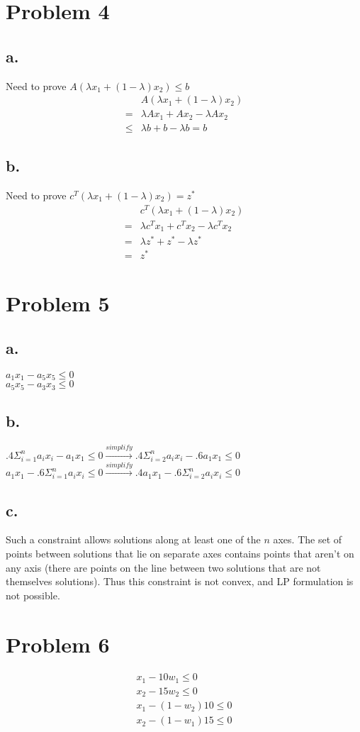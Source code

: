 \documentclass[12pt]{article}
\begin{document}
\newpage
\section*{Problem 4}
\subsection*{a.}
Need to prove $A(\lambda x_1 + (1-\lambda)x_2) \leq b$ \\
\begin{align*}
& A(\lambda x_1 + (1-\lambda)x_2) \\
= & \lambda Ax_1 + Ax_2 - \lambda Ax_2 \\
\leq & \lambda b + b - \lambda b = b
\end{align*}

\subsection*{b.}
Need to prove $c^T(\lambda x_1 + (1 - \lambda)x_2) = z^*$ \\
\begin{align*}
& c^T(\lambda x_1 + (1 - \lambda)x_2) \\
= & \lambda c^T x_1 + c^T x_2 - \lambda c^T x_2 \\
= & \lambda z^* + z^* - \lambda z^* \\
= & z^*
\end{align*}

\newpage
\section*{Problem 5}
\subsection*{a.}
$a_1 x_1 - a_5 x_5 \leq 0$ \\
$a_5 x_5 - a_3 x_3 \leq 0$

\subsection*{b.}
$.4\Sigma_{i=1}^{n} a_i x_i - a_1 x_1 \leq 0 \xrightarrow{simplify} .4\Sigma_{i=2}^{n} a_i x_i - .6 a_1 x_1 \leq 0$ \\
$a_1 x_1 - .6\Sigma_{i=1}^{n} a_i x_i \leq 0 \xrightarrow{simplify} .4 a_1 x_1 - .6\Sigma_{i=2}^{n} a_i x_i \leq 0$

\subsection*{c.}
Such a constraint allows solutions along at least one of the $n$ axes. The set of points between solutions that lie on separate axes contains points that aren't on any axis (there are points on the line between two solutions that are not themselves solutions). Thus this constraint is not convex, and LP formulation is not possible.

\newpage
\section*{Problem 6}
\begin{align*}
x_1 - 10w_1 \leq 0 \\
x_2 - 15w_2 \leq 0 \\
x_1 - (1-w_2)10 \leq 0 \\
x_2 - (1-w_1)15 \leq 0
\end{align*}
\end{document}
